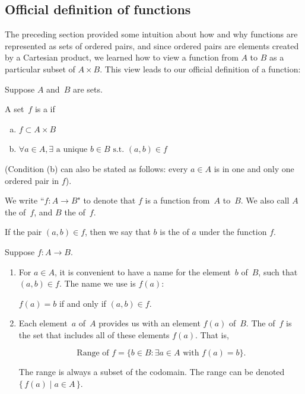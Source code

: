 \subsection{Official definition of functions}

The preceding section provided some intuition about how and why functions are represented as sets of ordered pairs, and since ordered pairs are elements created by a Cartesian product, we learned how to view a function from $A$ to $B$ as a particular subset of $A \times B$.  This view leads to our official definition of a function:

\begin{defn}{}
 Suppose $A$ and~$B$ are sets.

A set~$f$ is a 
 if
\begin{enumerate}[(a)]
\item \label{FunctionDefn-func-pair}
$f \subset A \times B$
\item \label{FunctionDefn-func-unique}
$\forall a \in A, \exists \mbox{ a unique } b \in B \mbox{ s.t. } (a, b) \in f$
\end{enumerate}

\noindent
(Condition (b) can also be stated as follows: every $a \in A$ is in one and only one ordered pair in $f$).  

We write ``$f \colon A \to B$" to denote that $f$ is a function from~$A$ to~$B$.
We also call
$A$  the  of~$f$, and
$B$ the  of~$f$.

If the pair $(a, b) \in f$, then we say that $b$ is the  of $a$ under the function $f$.


\end{defn}

\begin{notation}{} \label{FunctionNotation}
 Suppose $f \colon A \to B$. 
\begin{enumerate}
\item For $a \in A$, it is convenient to have a name for the element~$b$ of~$B$, such that $(a,b) \in f$. The name we use is $f(a)$:
\begin{center}
$f(a) = b$ if and only if $(a,b) \in f$.
\end{center}
\item \label{FunctionNotation-range}
 Each element~$a$ of~$A$ provides us with an element $f(a)$ of~$B$. The  of~$f$ is the set that includes all of these elements $f(a)$. That is,

\[ \mbox{Range of }f = \{b \in B : \exists a \in A \mbox{ with } f(a)=b\}.\]

The range is always a subset of the codomain. The range can be denoted $\{\, f(a) \mid a \in A \, \}$.
\end{enumerate}
\end{notation}

